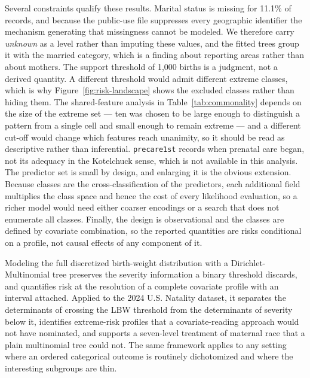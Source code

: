 \documentclass[AMA]{USG}
\begin{document}

Several constraints qualify these results. Marital status is missing for 11.1\% of records, and because the public-use file suppresses every geographic identifier the mechanism generating that missingness cannot be modeled. We therefore carry \emph{unknown} as a level rather than imputing these values, and the fitted trees group it with the married category, which is a finding about reporting areas rather than about mothers. The support threshold of 1{,}000 births is a judgment, not a derived quantity. A different threshold would admit different extreme classes, which is why Figure~\ref{fig:risk-landscape} shows the excluded classes rather than hiding them. The shared-feature analysis in Table~\ref{tab:commonality} depends on the size of the extreme set --- ten was chosen to be large enough to distinguish a pattern from a single cell and small enough to remain extreme --- and a different cut-off would change which features reach unanimity, so it should be read as descriptive rather than inferential. \texttt{precare1st} records when prenatal care began, not its adequacy in the Kotelchuck sense, which is not available in this analysis. The predictor set is small by design, and enlarging it is the obvious extension. Because classes are the cross-classification of the predictors, each additional field multiplies the class space and hence the cost of every likelihood evaluation, so a richer model would need either coarser encodings or a search that does not enumerate all classes. Finally, the design is observational and the classes are defined by covariate combination, so the reported quantities are risks conditional on a profile, not causal effects of any component of it.


Modeling the full discretized birth-weight distribution with a Dirichlet-Multinomial tree preserves the severity information a binary threshold discards, and quantifies risk at the resolution of a complete covariate profile with an interval attached. Applied to the 2024 U.S. Natality dataset, it separates the determinants of crossing the LBW threshold from the determinants of severity below it, identifies extreme-risk profiles that a covariate-reading approach would not have nominated, and supports a seven-level treatment of maternal race that a plain multinomial tree could not. The same framework applies to any setting where an ordered categorical outcome is routinely dichotomized and where the interesting subgroups are thin.
\end{document}
